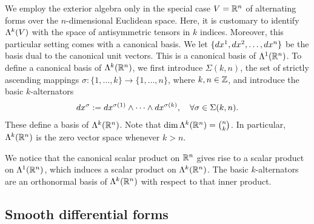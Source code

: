 \documentclass[10pt,a4paper]{article}
\begin{document}
We employ the exterior algebra only in the special case $V = {\mathbb R}^{n}$ of alternating forms over the $n$-dimensional Euclidean space. 
Here, it is customary to identify $\Lambda^{k}(V)$ with the space of antisymmetric tensors in $k$ indices. 
Moreover, this particular setting comes with a canonical basis. 
We let \(\{dx^1, dx^2, \ldots, dx^{n}\}\) be the basis dual to the canonical unit vectors.
This is a canonical basis of $\Lambda^{1}({\mathbb R}^{n})$. 
To define a canonical basis of $\Lambda^{k}({\mathbb R}^{n})$, 
we first introduce $\Sigma(k,n)$, the set of strictly ascending mappings $\sigma : \{1,\dots,k\} \rightarrow \{1,\dots,n\}$, where $k, n \in {\mathbb Z}$, 
and introduce the basic $k$-alternators 
\begin{align*}
    dx^{\sigma} := dx^{\sigma(1)} \wedge \dots \wedge dx^{\sigma(k)}, 
    \quad 
    \forall \sigma \in \Sigma(k,n). 
\end{align*}
These define a basis of $\Lambda^{k}({\mathbb R}^{n})$.
Note that 
$\dim \Lambda^{k}({\mathbb R}^{n}) = \binom{n}{k}$. 
In particular, $\Lambda^{k}({\mathbb R}^{n})$ is the zero vector space whenever $k > n$.

We notice that the canonical scalar product on ${\mathbb R}^{n}$ gives rise to a scalar product on $\Lambda^{1}({\mathbb R}^{n})$,
which induces a scalar product on $\Lambda^{k}({\mathbb R}^{n})$.
The basic $k$-alternators are an orthonormal basis of $\Lambda^{k}({\mathbb R}^{n})$ with respect to that inner product. 

\subsection{Smooth differential forms}
\end{document}

